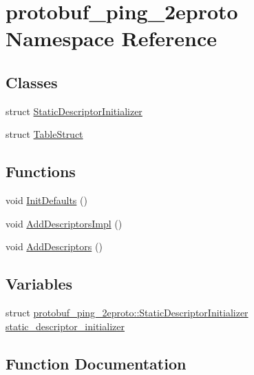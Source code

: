 \hypertarget{namespaceprotobuf__ping__2eproto}{}\section{protobuf\+\_\+ping\+\_\+2eproto Namespace Reference}
\label{namespaceprotobuf__ping__2eproto}
\subsection*{Classes}
\begin{DoxyCompactItemize}
\item 
struct \hyperlink{structprotobuf__ping__2eproto_1_1_static_descriptor_initializer}{Static\+Descriptor\+Initializer}
\item 
struct \hyperlink{structprotobuf__ping__2eproto_1_1_table_struct}{Table\+Struct}
\end{DoxyCompactItemize}
\subsection*{Functions}
\begin{DoxyCompactItemize}
\item 
void \hyperlink{namespaceprotobuf__ping__2eproto_a4da00112559a8a5b501ec9d17927aab2}{Init\+Defaults} ()
\item 
void \hyperlink{namespaceprotobuf__ping__2eproto_a208142d5c3a1fb52a39b9221afe49f5a}{Add\+Descriptors\+Impl} ()
\item 
void \hyperlink{namespaceprotobuf__ping__2eproto_ae3cb3909c68bd4b876872dafd97cb142}{Add\+Descriptors} ()
\end{DoxyCompactItemize}
\subsection*{Variables}
\begin{DoxyCompactItemize}
\item 
struct \hyperlink{structprotobuf__ping__2eproto_1_1_static_descriptor_initializer}{protobuf\+\_\+ping\+\_\+2eproto\+::\+Static\+Descriptor\+Initializer} \hyperlink{namespaceprotobuf__ping__2eproto_a117cab3e5661b7c6b74347dae80dd6ea}{static\+\_\+descriptor\+\_\+initializer}
\end{DoxyCompactItemize}


\subsection{Function Documentation}
